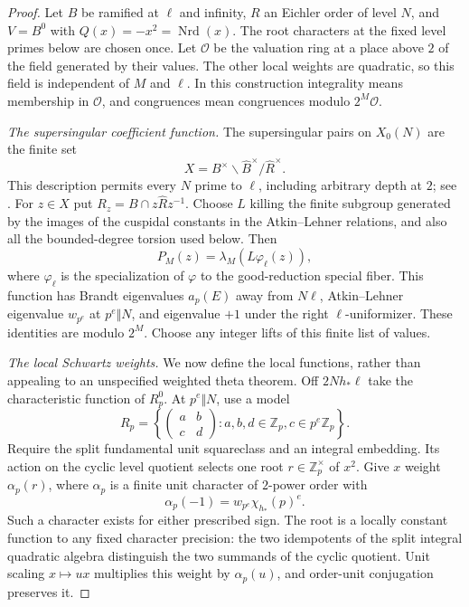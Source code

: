 \begin{proof}
Let $B$ be ramified at $\ell$ and infinity, $R$ an Eichler order of
level $N$, and $V=B^0$ with $Q(x)=-x^2=\operatorname{Nrd}(x)$.
The root characters at the fixed level primes below are chosen once.
Let $\mathcal O$ be the valuation ring at a place above $2$ of the
field generated by their values.  The other local weights are
quadratic, so this field is independent of $M$ and $\ell$.
In this construction integrality means membership in $\mathcal O$,
and congruences mean congruences modulo $2^M\mathcal O$.
\par\smallskip\noindent\emph{The supersingular coefficient function.}
The supersingular pairs on $X_0(N)$ are the finite set
\[
 X=B^\times\backslash\widehat B^\times/\widehat R^\times.
\]
This description permits every $N$ prime to $\ell$, including arbitrary
depth at $2$; see \cite[\S\S1.1--1.2,2.4--2.6]{JetchevKane2010}.
For $z\in X$ put $R_z=B\cap z\widehat Rz^{-1}$.
Choose $L$ killing the finite subgroup generated by the images of the
cuspidal constants in the Atkin--Lehner relations, and also all the
bounded-degree torsion used below.  Then
\[
 P_M(z)=\lambda_M(L\varphi_\ell(z)),
\]
where $\varphi_\ell$ is the specialization of $\varphi$ to the
good-reduction special fiber.  This function has Brandt eigenvalues
$a_p(E)$ away from $N\ell$, Atkin--Lehner
eigenvalue $w_{p^e}$ at $p^e\Vert N$, and eigenvalue $+1$ under the
right $\ell$-uniformizer.  These identities are modulo $2^M$.
Choose any integer lifts of this finite list of values.

\par\smallskip\noindent\emph{The local Schwartz weights.}
We now define the local functions, rather than appealing to an
unspecified weighted theta theorem.  Off $2Nh_*\ell$ take the
characteristic function of $R_p^0$.  At $p^e\Vert N$, use a model
\[
 R_p=\left\{\begin{pmatrix}a&b\\c&d\end{pmatrix}
       :a,b,d\in\mathbb Z_p, c\in p^e\mathbb Z_p\right\}.
\]
Require the split fundamental unit squareclass and an integral
embedding.  Its action on the cyclic level quotient selects one root
$r\in\mathbb Z_p^\times$ of $x^2$.  Give $x$ weight $\alpha_p(r)$,
where $\alpha_p$ is a finite unit character of $2$-power order with
\begin{equation}\label{co:root-parity}
 \alpha_p(-1)=w_{p^e}\chi_{h_*}(p)^e.
\end{equation}
Such a character exists for either prescribed sign.  The root is a
locally constant function to any fixed character precision: the two
idempotents of the split integral quadratic algebra distinguish the
two summands of the cyclic quotient.  Unit scaling $x\mapsto ux$
multiplies this weight by $\alpha_p(u)$, and order-unit conjugation
preserves it.


\end{proof}
